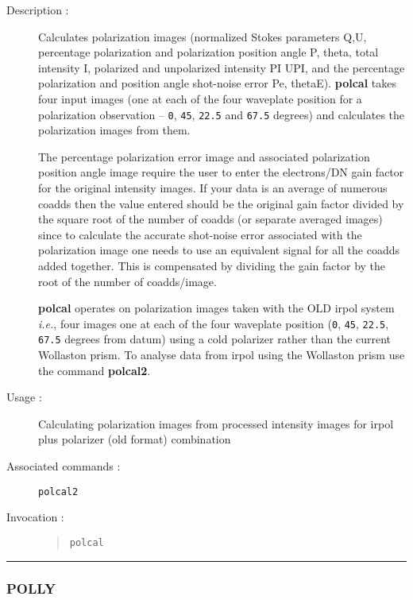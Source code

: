 \begin{description}

\item[Description :] Calculates polarization images (normalized Stokes
parameters Q,U, percentage polarization and polarization position angle
P, theta, total intensity I, polarized and unpolarized intensity PI
UPI, and the percentage polarization and position angle shot-noise
error Pe, thetaE). {\bf polcal} takes four input images (one at each of
the four waveplate position for a polarization observation -- {\tt 0},
{\tt 45}, {\tt 22.5} and {\tt 67.5} degrees) and calculates the polarization
images from them.

The percentage polarization error image and associated polarization
position angle image require the user to enter the electrons/DN gain
factor for the original intensity images.  If your data is an average of
numerous coadds then the value entered should be the original gain factor
divided by the square root of the number of coadds (or separate averaged
images) since to calculate the accurate shot-noise error associated with
the polarization image one needs to use an equivalent signal for all the
coadds added together.  This is compensated by dividing the gain factor
by the root of the number of coadds/image.

{\bf polcal} operates on polarization images taken with the OLD {\sc
irpol} system \emph{i.e.}, four images one at each of the four
waveplate position ({\tt 0}, {\tt 45}, {\tt 22.5}, {\tt 67.5} degrees
from datum) using a cold polarizer rather than the current Wollaston
prism.  To analyse data from {\sc irpol} using the Wollaston prism use
the command {\bf polcal2}.

\item[Usage :] Calculating polarization images from processed intensity
images for {\sc irpol} plus polarizer (old format) combination

\item[Associated commands :] {\tt polcal2}

\item[Invocation :]

\begin{quote}{\tt  polcal }\end{quote}

\end{description}

\hrule
\subsubsection*{\label{POLLY}POLLY}

